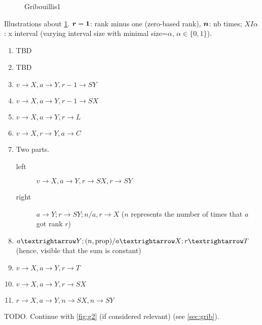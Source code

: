 \documentclass[version=last, pagesize, twoside=off, bibliography=totoc, DIV=calc, fontsize=12pt, a4paper, french, english]{scrartcl}
\begin{document}
\begin{figure}
	\caption{Gribouillis1}
	\label{fig:g1}
\end{figure}
Illustrations about \cref{fig:g1}. ${\bm{r-1}}$: rank minus one (zero-based rank), ${\bm{n}}$: nb times; $XI\alpha$: x interval (varying interval size with minimal size=$\alpha$, $\alpha \in \{0, 1\}$). 
\begin{enumerate}
	\item TBD
	\item TBD
	\item $v→X, a→Y, r-1→SY$
	\item $v→X, a→Y, r-1→SX$
	\item $v→X, a→Y, r→L$
	\item $v→X, r→Y, a→C$
	\item Two parts.
	\begin{description}
		\item[left] $v→X, a→Y, r→SX, r→SY$
		\item[right] $a→Y; r→SY; n/a, r→X$ ($n$ represents the number of times that $a$ got rank $r$)
	\end{description}
	\item $a→Y; (n, \textnormal{prop})/a→X; r→T$ (hence, visible that the sum is constant)
	\item $v→X, a→Y, r→T$
	\item \label{it:vert} $v→X, a→Y, r→SX$
	\item \label{it:squares} $r→X, a→Y, n→SX, n→SY$
\end{enumerate}
TODO. Continue with \cref{fig:g2} (if considered relevant) (see \cref{sec:grib}).
\end{document}

